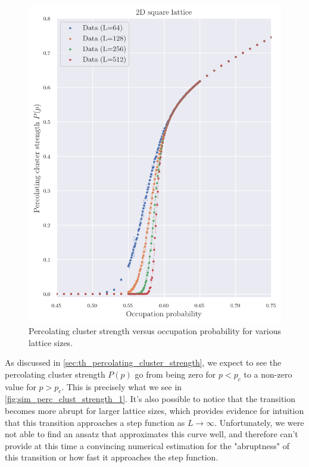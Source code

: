 \begin{figure}[H]
  \includegraphics[width=\linewidth]{Images/sim_perc_clust_strength_1.png}
  \caption{Percolating cluster strength versus occupation probability for various lattice sizes.}
  \label{fig:sim_perc_clust_strength_1}
\end{figure}

As discussed in \autoref{sec:th_percolating_cluster_strength}, we expect to see the percolating cluster strength $P(p)$ go from being zero for $p < p_c$ to a non-zero value for $p > p_c$. This is precisely what we see in \autoref{fig:sim_perc_clust_strength_1}. It's also possible to notice that the transition becomes more abrupt for larger lattice sizes, which provides evidence for intuition that this transition approaches a step function as $L \to \infty$.
Unfortunately, we were not able to find an ansatz that approximates this curve well, and therefore can't provide at this time a convincing numerical estimation for the "abruptness" of this transition or how fast it approaches the step function. 





